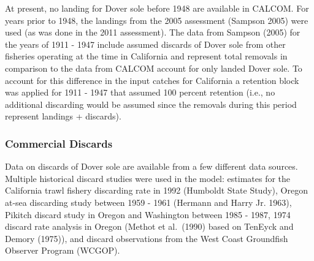 \documentclass[11pt,
  english,
  a4paper,
]{article}
\begin{document}

At present, no landing for Dover sole before 1948 are available in CALCOM. For years prior to 1948, the landings from the 2005 assessment {(Sampson 2005)\leavevmode\tagmcend\tagstructend} were used (as was done in the 2011 assessment). The data from Sampson {(2005)\leavevmode\tagmcend\tagstructend} for the years of 1911 - 1947 include assumed discards of Dover sole from other fisheries operating at the time in California and represent total removals in comparison to the data from CALCOM account for only landed Dover sole. To account for this difference in the input catches for California a retention block was applied for 1911 - 1947 that assumed 100 percent retention (i.e., no additional discarding would be assumed since the removals during this period represent landings + discards).

\leavevmode\tagmcend\tagstructend\par


\hypertarget{commercial-discards}{%
\subsubsection{Commercial Discards}\label{commercial-discards}}

\leavevmode\tagmcend\tagstructend


Data on discards of Dover sole are available from a few different data sources. Multiple historical discard studies were used in the model: estimates for the California trawl fishery discarding rate in 1992 (Humboldt State Study), Oregon at-sea discarding study between 1959 - 1961 {(Hermann and Harry Jr. 1963)\leavevmode\tagmcend\tagstructend}, Pikitch discard study in Oregon and Washington between 1985 - 1987, 1974 discard rate analysis in Oregon (Methot et al.~{(1990)\leavevmode\tagmcend\tagstructend} based on TenEyck and Demory {(1975)\leavevmode\tagmcend\tagstructend}), and discard observations from the West Coast Groundfish Observer Program (WCGOP).

\leavevmode\tagmcend\tagstructend\par
\end{document}
